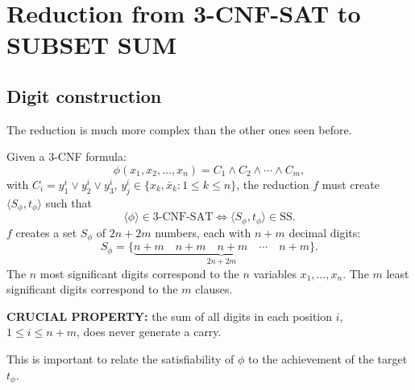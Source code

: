 \section{Reduction from 3-CNF-SAT to SUBSET SUM}
\subsection{Digit construction}
The reduction is much more complex than the other ones seen before.

Given a 3-CNF formula:
\[
\phi(x_1,x_2,\ldots,x_n)=C_1\land C_2\land\cdots\land C_m,
\]
with $C_i=y_1^i\lor y_2^i\lor y_3^i$, $y_j^i\in\{x_k,\bar x_k:1\leq k\leq n\}$,
the reduction $f$ must create $\langle S_\phi,t_\phi\rangle$ such that
\[
\langle\phi\rangle\in\mathrm{3\text{-}CNF\text{-}SAT}\Longleftrightarrow\langle S_\phi,t_\phi\rangle\in\mathrm{SS}.
\]
$f$ creates a set $S_\phi$ of $2n+2m$ numbers, each with $n+m$ decimal digits:
\[
S_\phi=\{\underbrace{\boxed{n+m}\quad\boxed{n+m}\quad\boxed{n+m}\quad\cdots\quad\boxed{n+m}}_{2n+2m}\}.
\]
The $n$ most significant digits correspond to the $n$ variables $x_1,\ldots,x_n$. The $m$ least significant digits correspond to the $m$ clauses.

\textbf{CRUCIAL PROPERTY:} the sum of all digits in each position $i$, $1\leq i\leq n+m$, does never generate a carry.

This is important to relate the satisfiability of $\phi$ to the achievement of the target $t_\phi$.
